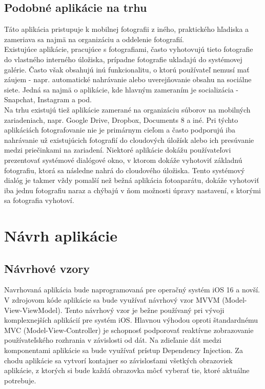 \documentclass[11pt]{article} %
\begin{document}
\subsection{Podobné aplikácie na trhu}
Táto aplikácia pristupuje k mobilnej fotografii z iného, praktického hľadiska a zameriava sa najmä na organizáciu a oddelenie fotografií.\\
Existujúce aplikácie, pracujúce s fotografiami, často vyhotovujú tieto fotografie do vlastného interného úložiska, prípadne fotografie ukladajú do systémovej galérie. Často však obsahujú inú funkcionalitu, o ktorú používateľ nemusí mať záujem - napr. automatické nahrávanie alebo uverejňovanie obsahu na sociálne siete. Jedná sa najmä o aplikácie, kde hlavným zameraním je socializácia - Snapchat, Instagram a pod.\\
Na trhu existujú tiež aplikácie zamerané na organizáciu súborov na mobilných zariadeniach, napr. Google Drive, Dropbox, Documents 8 a iné. Pri týchto aplikáciách fotografovanie nie je primárnym cieľom a často podporujú iba nahrávanie už existujúcich fotografií do cloudových úložísk alebo ich presúvanie medzi priečinkami na zariadení. Niektoré aplikácie dokážu používateľovi prezentovať systémové dialógové okno, v ktorom dokáže vyhotoviť základnú fotografiu, ktorá sa následne nahrá do cloudového úložiska. Tento systémový dialóg je takmer vždy pomalší než bežná aplikácia fotoaparátu, dokáže vyhotoviť iba jednu fotografiu naraz a chýbajú v ňom možnosti úpravy nastavení, s ktorými sa fotografia vyhotoví.

\pagebreak
\section{Návrh aplikácie}
\subsection{Návrhové vzory}
Navrhovaná aplikácia bude naprogramovaná pre operačný systém iOS 16 a novší. V zdrojovom kóde aplikácie sa bude využívať návrhový vzor MVVM (Model-View-ViewModel). Tento návrhový vzor je bežne používaný pri vývoji komplexnejších aplikácií pre systém iOS. Hlavnou výhodou oproti štandardnému MVC (Model-View-Controller) je schopnosť podporovať reaktívne zobrazovanie používateľského rozhrania v závislosti od dát. Na zdieľanie dát medzi komponentami aplikácie sa bude využívať prístup Dependency Injection. Za chodu aplikácie sa vytvorí kontajner so závislosťami všetkých obrazoviek aplikácie, z ktorých si bude každá obrazovka môcť vyberať tie, ktoré aktuálne potrebuje.\\
\end{document}
